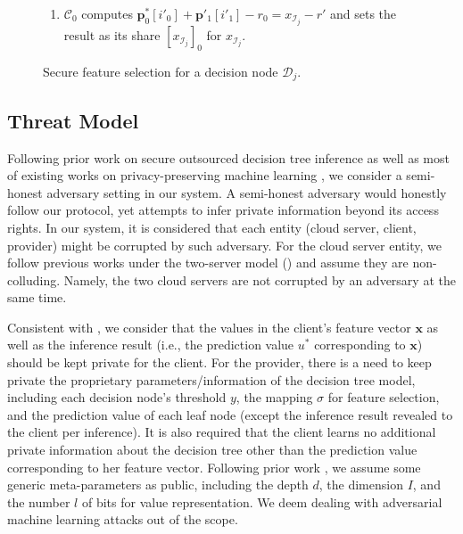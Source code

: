 \documentclass[10pt,journal,compsoc]{IEEEtran}
\begin{document}
\begin{figure*}[!t]
{\begin{minipage} [t]{0.8\textwidth}
\begin{enumerate}[1:]
\item $\mathcal{C}_0$ computes $\mathbf{p}^*_0[i'_0]+ \mathbf{p}'_1[i'_1]-r_0=x_{\mathcal{I}_j}-r'$ and sets the result as its share $[x_{\mathcal{I}_j}]_0$ for $x_{\mathcal{I}_j}$.

\end{enumerate}

\end{minipage}
}
%
\caption{Secure feature selection for a decision node $\mathcal{D}_j$.}
\label{fig:secure-input-selection}
\end{figure*}

\subsection{Threat Model}
%

Following prior work on secure outsourced decision tree inference as well as most of existing works on privacy-preserving machine learning \cite{ZhengDWWN20,0002SKG19,MohasselZ17}, we consider a semi-honest adversary setting in our system.
%
A semi-honest adversary would honestly follow our protocol, yet attempts to infer private information beyond its access rights.
%
In our system, it is considered that each entity (cloud server, client, provider) might be corrupted by such adversary.
%
For the cloud server entity, we follow previous works under the two-server model (\cite{MohasselZ17,ZhengDWWN20,ChenPopa20,0002SKG19,ZhengDW18,WangWHZR16}) and assume they are non-colluding.
%
Namely, the two cloud servers are not corrupted by an adversary at the same time.



Consistent with \cite{ZhengDWWN20}, we consider that the values in the client's feature vector $\mathbf{x}$ as well as the inference result (i.e., the prediction value $u^*$ corresponding to $\mathbf{x}$) should be kept private for the client.
% 
For the provider, there is a need to keep private the proprietary parameters/information of the decision tree model, including each decision node's threshold $y$, the mapping $\sigma$ for feature selection, and the prediction value of each leaf node (except the inference result revealed to the client per inference).
%
It is also required that the client learns no additional private information about the decision tree other than the prediction value corresponding to her feature vector.
%
Following prior work \cite{DWuFNL16,ZhengDWWN20}, we assume some generic meta-parameters as public, including the depth $d$, the dimension $I$, and the number $l$ of bits for value representation.
We deem dealing with adversarial machine learning attacks out of the scope.
\end{document}
